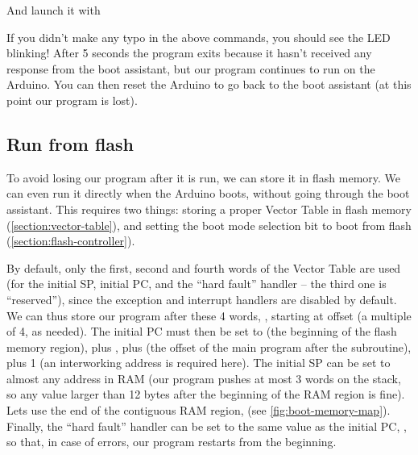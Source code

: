 
\noindent And launch it with


\indent If you didn't make any typo in the above commands, you should see the
LED blinking! After 5 seconds the  program exits because
it hasn't received any response from the boot assistant, but our program
continues to run on the Arduino. You can then reset the Arduino to go back to
the boot assistant (at this point our program is lost).

\subsection{Run from flash}\label{subsection:blink-led-flash}

To avoid losing our program after it is run, we can store it in flash memory.
We can even run it directly when the Arduino boots, without going through the
boot assistant. This requires two things: storing a proper Vector Table in
flash memory (\cf \cref{section:vector-table}), and setting the boot mode
selection bit to boot from flash (\cf \cref{section:flash-controller}).

By default, only the first, second and fourth words of the Vector Table are
used (for the initial SP, initial PC, and the “hard fault” handler -- the third
one is “reserved”), since the exception and interrupt handlers are disabled by
default. We can thus store our program after these 4 words, \ie, starting at
offset  (a multiple of 4, as needed). The initial PC must then be set
to  (the beginning of the flash memory region), plus ,
plus  (the offset of the main program after the subroutine), plus 1
(an interworking address is required here). The initial SP can be set to almost
any address in RAM (our program pushes at most 3 words on the stack, so any
value larger than 12 bytes after the beginning of the RAM region is fine). Lets
use the end of the contiguous RAM region,  (see
\cref{fig:boot-memory-map}). Finally, the ``hard fault'' handler can be set to
the same value as the initial PC, , so that, in case of errors, our
program restarts from the beginning.

